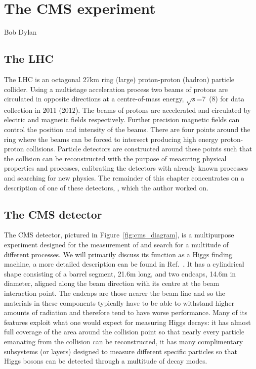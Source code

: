 \chapter{The CMS experiment}
\label{chap:cms}
{Bob Dylan}

\section{The LHC}

The \acf{LHC} is an octagonal 27km ring (large) proton-proton (hadron) particle collider. Using a multistage acceleration process two beams of protons are circulated in opposite directions at a centre-of-mass energy, $\sqrt{s}$=7\TeV~(8\TeV) for data collection in 2011 (2012). The beams of protons are accelerated and circulated by electric and magnetic fields respectively. Further precision magnetic fields can control the position and intensity of the beams. There are four points around the ring where the beams can be forced to intersect producing high energy proton-proton collisions. Particle detectors are constructed around these points such that the collision can be reconstructed with the purpose of measuring physical properties and processes, calibrating the detectors with already known processes and searching for new physics. The remainder of this chapter concentrates on a description of one of these detectors, \CMS, which the author worked on.

\section{The CMS detector}

The \acf{CMS} detector, pictured in Figure~\ref{fig:cms_diagram}, is a multipurpose experiment designed for the measurement of and search for a multitude of different processes. We will primarily discuss its function as a Higgs finding machine, a more detailed description can be found in Ref.~\cite{CMS_JINST}. It has a cylindrical shape consisting of a barrel segment, 21.6m long, and two endcaps, 14.6m in diameter, aligned along the beam direction with its centre at the beam interaction point. The endcaps are those nearer the beam line and so the materials in these components typically have to be able to withstand higher amounts of radiation and therefore tend to have worse performance. Many of its features exploit what one would expect for measuring Higgs decays: it has almost full coverage of the area around the collision point so that nearly every particle emanating from the collision can be reconstructed, it has many complimentary subsystems (or layers) designed to measure different specific particles so that Higgs bosons can be detected through a multitude of decay modes. 

